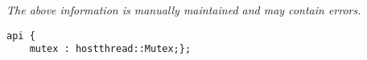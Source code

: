 \label{pkg:winix\_file\_io\_mutex}

{\tiny \it The above information is manually maintained and may contain errors.}
\begin{verbatim}
api {
    mutex : hostthread::Mutex;};
\end{verbatim}

